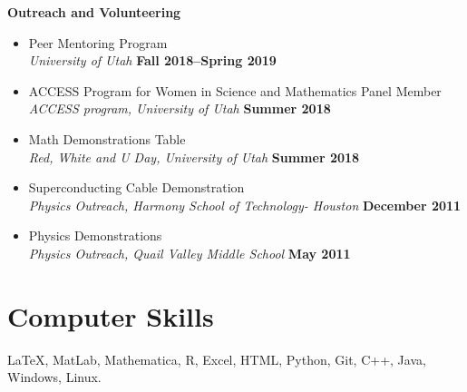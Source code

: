 \documentclass[margin,line]{res}
\begin{document}
\begin{resume}
{\bf Outreach and Volunteering}
\begin{itemize}
    \item[ ] Peer Mentoring Program
    \\ {\it University of Utah} \hfill {\bf Fall 2018--Spring 2019}
    \item[ ] ACCESS Program for Women in Science and Mathematics Panel Member 
    \\ {\it ACCESS program, University of Utah} \hfill {\bf Summer 2018}
    \item[ ] Math Demonstrations Table
    \\ {\it Red, White and U Day, University of Utah} \hfill {\bf Summer 2018}
    \item[ ] Superconducting Cable Demonstration
    \\ {\it Physics Outreach, Harmony School of Technology- Houston} \hfill {\bf December 2011}
    \item[ ] Physics Demonstrations
    \\ {\it Physics Outreach, Quail Valley Middle School} \hfill {\bf May 2011}
\end{itemize}



\section{\sc Computer Skills} 
\LaTeX, MatLab, Mathematica, R, Excel, HTML, Python, Git, C++, Java, Windows, Linux.


\end{resume}
\end{document}
